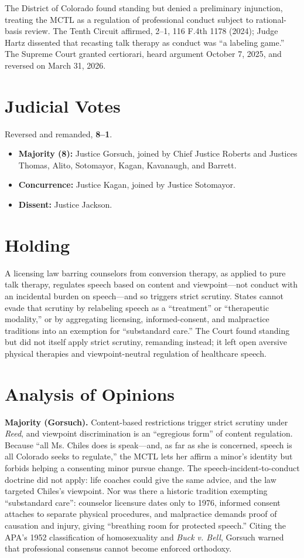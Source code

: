 \documentclass[12pt]{article}
\begin{document}
The District of Colorado found standing but denied a preliminary injunction, treating the MCTL as a regulation of professional conduct subject to rational-basis review. The Tenth Circuit affirmed, 2--1, 116 F.4th 1178 (2024); Judge Hartz dissented that recasting talk therapy as conduct was ``a labeling game.'' The Supreme Court granted certiorari, heard argument October 7, 2025, and reversed on March 31, 2026.

\section{Judicial Votes}

Reversed and remanded, \textbf{8--1}.
\begin{itemize}
\item \textbf{Majority (8):} Justice Gorsuch, joined by Chief Justice Roberts and Justices Thomas, Alito, Sotomayor, Kagan, Kavanaugh, and Barrett.
\item \textbf{Concurrence:} Justice Kagan, joined by Justice Sotomayor.
\item \textbf{Dissent:} Justice Jackson.
\end{itemize}

\section{Holding}

A licensing law barring counselors from conversion therapy, as applied to pure talk therapy, regulates speech based on content and viewpoint---not conduct with an incidental burden on speech---and so triggers strict scrutiny. States cannot evade that scrutiny by relabeling speech as a ``treatment'' or ``therapeutic modality,'' or by aggregating licensing, informed-consent, and malpractice traditions into an exemption for ``substandard care.'' The Court found standing but did not itself apply strict scrutiny, remanding instead; it left open aversive physical therapies and viewpoint-neutral regulation of healthcare speech.

\section{Analysis of Opinions}

\textbf{Majority (Gorsuch).} Content-based restrictions trigger strict scrutiny under \textit{Reed}, and viewpoint discrimination is an ``egregious form'' of content regulation. Because ``all Ms. Chiles does is speak---and, as far as she is concerned, speech is all Colorado seeks to regulate,'' the MCTL lets her affirm a minor's identity but forbids helping a consenting minor pursue change. The speech-incident-to-conduct doctrine did not apply: life coaches could give the same advice, and the law targeted Chiles's viewpoint. Nor was there a historic tradition exempting ``substandard care'': counselor licensure dates only to 1976, informed consent attaches to separate physical procedures, and malpractice demands proof of causation and injury, giving ``breathing room for protected speech.'' Citing the APA's 1952 classification of homosexuality and \textit{Buck v. Bell}, Gorsuch warned that professional consensus cannot become enforced orthodoxy.
\end{document}
